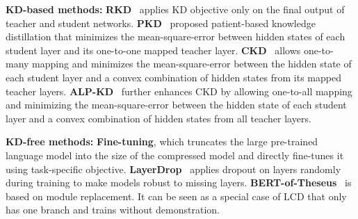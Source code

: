 \textbf{KD-based methods:}
\textbf{RKD}~\cite{kd} applies KD objective only on the final output of teacher and student networks. \textbf{PKD}~\cite{pkd} proposed patient-based knowledge distillation that minimizes the mean-square-error between hidden states of each student layer and its one-to-one mapped teacher layer.
 \textbf{CKD}~\cite{ckd} allows one-to-many mapping and minimizes the mean-square-error between the hidden state of each student layer and a convex combination of hidden states from its mapped teacher layers.
\textbf{ALP-KD}~\cite{alpkd} further enhances CKD by allowing one-to-all mapping and minimizing the mean-square-error between the hidden state of each student layer and a convex combination of hidden states from all teacher layers.

\textbf{KD-free methods:}
\textbf{Fine-tuning}, which truncates the large pre-trained language model into the size of the compressed model and directly fine-tunes it using task-specific objective.
 \textbf{LayerDrop}~\cite{layerdrop} applies dropout on layers randomly during training to make models robust to missing layers.
\textbf{BERT-of-Theseus}~\cite{theseus} is based on module replacement. It can be seen as a special case of LCD that only has one branch and trains without demonstration.

